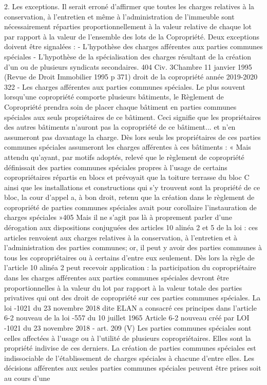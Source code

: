		2. Les exceptions.
		Il serait erroné d’affirmer que toutes les charges relatives à la conservation, à l’entretien et même à l’administration de l’immeuble sont nécessairement réparties proportionnellement à la valeur relative de chaque lot par rapport à la valeur de l’ensemble des lots de la Copropriété.
		Deux exceptions doivent être signalées :
		- L’hypothèse des charges afférentes aux parties communes spéciales
		- L’hypothèse de la spécialisation des charges résultant de la création d’un ou de plusieurs syndicats secondaires.
		404 Civ. 3\degres Chambre 11 janvier 1995 (Revue de Droit Immobilier 1995 p 371)
		droit de la copropriété année 2019-2020
		322
		- Les charges afférentes aux parties communes spéciales.
		Le plus souvent lorsqu'une copropriété comporte plusieurs bâtiments, le Règlement de Copropriété prendra soin de placer chaque bâtiment en parties communes spéciales aux seuls propriétaires de ce bâtiment. Ceci signifie que les propriétaires des autres bâtiments n'auront pas la copropriété de ce bâtiment... et n'en assumeront pas davantage la charge.
		Dès lors seuls les propriétaires de ces parties communes spéciales assumeront les charges afférentes à ces bâtiments :
		« Mais attendu qu’ayant, par motifs adoptés, relevé que le règlement de copropriété définissait des parties communes spéciales propres à l’usage de certains copropriétaires répartis en blocs et prévoyait que la toiture terrasse du bloc C ainsi que les installations et constructions qui s’y trouvent sont la propriété de ce bloc, la cour d’appel a, à bon droit, retenu que la création dans le règlement de copropriété de parties communes spéciales avait pour corollaire l’instauration de charges spéciales »405
		Mais il ne s'agit pas là à proprement parler d'une dérogation aux dispositions conjuguées des articles 10 alinéa 2 et 5 de la loi : ces articles renvoient aux charges relatives à la conservation, à l'entretien et à l'administration des parties communes; or, il peut y avoir des parties communes à tous les copropriétaires ou à certains d'entre eux seulement.
		Dès lors la règle de l'article 10 alinéa 2 peut recevoir application : la participation du copropriétaire dans les charges afférentes aux parties communes spéciales devront être proportionnelles à la valeur du lot par rapport à la valeur totale des parties privatives qui ont des droit de copropriété sur ces parties communes spéciales.
		La loi -1021 du 23 novembre 2018 dite ELAN a consacré ces principes dans l’article 6-2 nouveau de la loi -557 du 10 juillet 1965
		Article 6-2 nouveau créé par LOI -1021 du 23 novembre 2018 - art. 209 (V) Les parties communes spéciales sont celles affectées à l'usage ou à l'utilité de plusieurs copropriétaires. Elles sont la propriété indivise de ces derniers. La création de parties communes spéciales est indissociable de l'établissement de charges spéciales à chacune d'entre elles. Les décisions afférentes aux seules parties communes spéciales peuvent être prises soit au cours d'une
